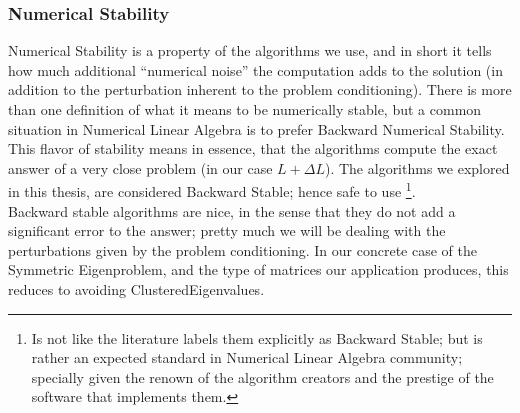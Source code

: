 \subsubsection{Numerical Stability}

Numerical Stability is a property of the algorithms we use, and in
short it tells how much additional ``numerical noise'' the computation
adds to the solution (in addition to the perturbation inherent to the
problem conditioning). There is more than one definition of what it
means to be numerically stable, but a common situation in Numerical
Linear Algebra is to prefer Backward Numerical Stability. This
flavor of stability means
in essence, that the algorithms compute the exact answer of a very
close problem (in our case $L + \Delta L$). The algorithms we explored 
in this thesis, are considered Backward Stable; hence safe to
use \footnote{Is not like the literature labels them explicitly as Backward
  Stable; but is rather an expected standard in Numerical Linear
  Algebra community; specially given the renown of the algorithm
creators and the prestige of the software that implements them.}. \\

Backward stable algorithms are
nice, in the sense that they do not add 
a significant error to the answer; pretty much we will be dealing with
the perturbations given by the problem conditioning. In our concrete
case of the Symmetric Eigenproblem, and the type of matrices our
application produces, this reduces to avoiding
\gls{ClusteredEigenvalues}.


